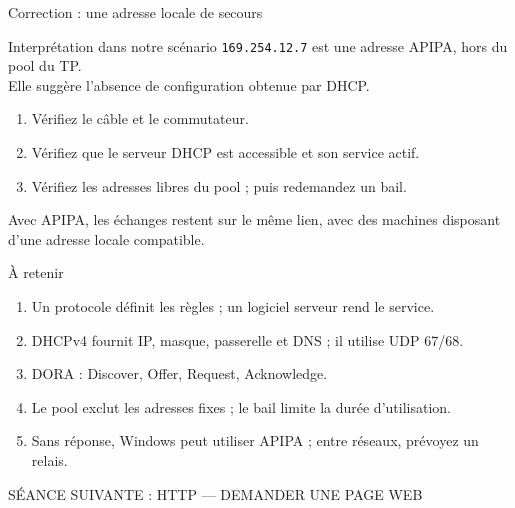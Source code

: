 \documentclass[aspectratio=169,11pt]{beamer}
\newcommand{\etiquette}[1]{{\color{or}\small\MakeUppercase{#1}}}
\begin{document}
\begin{frame}{Correction : une adresse locale de secours}
  \begin{block}{Interprétation dans notre scénario}
    \texttt{169.254.12.7} est une adresse APIPA, hors du pool du TP.\\
    Elle suggère l'absence de configuration obtenue par DHCP.
  \end{block}
  \begin{enumerate}
    \item Vérifiez le câble et le commutateur.
    \item Vérifiez que le serveur DHCP est accessible et son service actif.
    \item Vérifiez les adresses libres du pool ; puis redemandez un bail.
  \end{enumerate}
  Avec APIPA, les échanges restent sur le même lien,
  avec des machines disposant d'une adresse locale compatible.
\end{frame}

\begin{frame}{À retenir}
  \begin{enumerate}
    \item Un protocole définit les règles ; un logiciel serveur rend le service.
    \item DHCPv4 fournit IP, masque, passerelle et DNS ; il utilise UDP 67/68.
    \item DORA : Discover, Offer, Request, Acknowledge.
    \item Le pool exclut les adresses fixes ; le bail limite la durée d'utilisation.
    \item Sans réponse, Windows peut utiliser APIPA ; entre réseaux, prévoyez un relais.
  \end{enumerate}
  \bigskip
  \etiquette{Séance suivante : HTTP — demander une page Web}
\end{frame}
\end{document}
